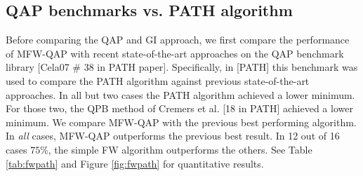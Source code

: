 \documentclass{article} %
\begin{document}
\subsection{QAP benchmarks vs. PATH algorithm}

Before comparing the QAP and GI approach, we first compare the performance of MFW-QAP with recent state-of-the-art approaches on the QAP benchmark library [Cela07 \# 38 in PATH paper].  Specifically, in [PATH] this benchmark was used to compare the PATH algorithm against previous state-of-the-art approaches.  In all but two cases the PATH algorithm achieved a lower minimum.  For those two, the QPB method of Cremers et al. [18 in PATH] achieved a lower minimum.  We compare MFW-QAP with the previous best performing algorithm.  In \emph{all} cases, MFW-QAP outperforms the previous best result.  In 12 out of 16 cases $75\%$, the simple FW algorithm outperforms the others.  See Table \ref{tab:fwpath} and Figure \ref{fig:fwpath} for quantitative results.
\end{document}
